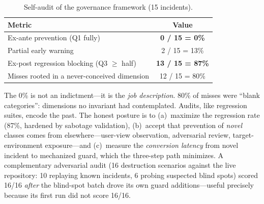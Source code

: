 \documentclass[conference]{IEEEtran}
\begin{document}
\begin{table}[h]
\centering
\caption{Self-audit of the governance framework (15 incidents).}
\label{tab:scorecard}
\footnotesize
\begin{tabular}{@{}p{6.0cm}c@{}}
\toprule
\textbf{Metric} & \textbf{Value}\\
\midrule
Ex-ante prevention (Q1 fully) & \textbf{0 / 15 = 0\%}\\
Partial early warning & 2 / 15 = 13\%\\
Ex-post regression blocking (Q3 $\geq$ half) & \textbf{13 / 15 = 87\%}\\
Misses rooted in a never-conceived dimension & 12 / 15 = 80\%\\
\bottomrule
\end{tabular}
\end{table}

The 0\% is not an indictment---it is the \emph{job description}. 80\% of
misses were ``blank categories'': dimensions no invariant had
contemplated. Audits, like regression suites, encode the past. The honest
posture is to (a)~maximize the regression rate (87\%, hardened by sabotage
validation), (b)~accept that prevention of \emph{novel} classes comes from
elsewhere---user-view observation, adversarial review, target-environment
exposure---and (c)~measure the \emph{conversion latency} from novel
incident to mechanized guard, which the three-step path minimizes. A
complementary adversarial audit (16 destruction scenarios against the live
repository: 10 replaying known incidents, 6 probing suspected blind spots)
scored 16/16 \emph{after} the blind-spot batch drove its own guard
additions---useful precisely because its first run did not score 16/16.
\end{document}

